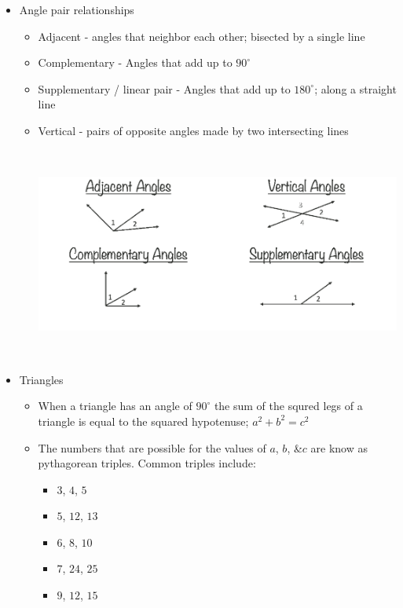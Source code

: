 \documentclass[11pt,letterpaper]{article}
\begin{document}
\begin{minipage}{\textwidth}
     \begin{itemize}
          \item Angle pair relationships
          \begin{itemize}
               \item Adjacent - angles that neighbor each other; bisected by a single line
               \item Complementary - Angles that add up to $90^{\circ}$
               \item Supplementary / linear pair -  Angles that add up to $180^{\circ}$; along a straight line
               \item Vertical - pairs of opposite angles made by two intersecting lines
               
               \vspace{0.2cm}
               \includegraphics[height = 7cm]{images/anglrel.jpg}
          \end{itemize}
          \vspace{-0.5cm}
          \item Triangles
          \begin{itemize}
               \item When a triangle has an angle of $90^{\circ}$ the sum of the squred legs of a triangle is equal to the squared hypotenuse; $a^2+b^2=c^2$
               \item The numbers that are possible for the values of $a$, $b$, &$c$ are know as pythagorean triples. Common triples include:
               \begin{itemize}
                    \item $3$, $4$, $5$
                    \item $5$, $12$, $13$
                    \item $6$, $8$, $10$
                    \item $7$, $24$, $25$
                    \item $9$, $12$, $15$
                    

\end{itemize}
\end{itemize}
\end{itemize}
\end{minipage}
\end{document}
